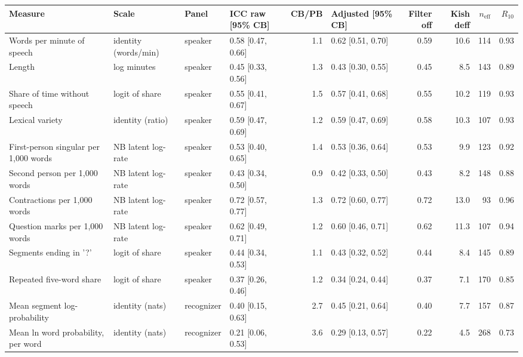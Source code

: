 {\scriptsize\setlength{\tabcolsep}{2.5pt}
\begin{tabular}{@{}p{}p{}llrlrrrr@{}}
\toprule
Measure & Scale & Panel & ICC raw [95\% CB] & CB/PB & Adjusted [95\% CB] & Filter off & Kish deff & $n_{\mathrm{eff}}$ & $R_{10}$ \\
\midrule
Words per minute of speech & identity (words/min) & speaker & 0.58 [0.47, 0.66] & 1.1 & 0.62 [0.51, 0.70] & 0.59 & 10.6 & 114 & 0.93 \\
Length & log minutes & speaker & 0.45 [0.33, 0.56] & 1.3 & 0.43 [0.30, 0.55] & 0.45 & 8.5 & 143 & 0.89 \\
Share of time without speech & logit of share & speaker & 0.55 [0.41, 0.67] & 1.5 & 0.57 [0.41, 0.68] & 0.55 & 10.2 & 119 & 0.93 \\
Lexical variety & identity (ratio) & speaker & 0.59 [0.47, 0.69] & 1.2 & 0.59 [0.47, 0.69] & 0.58 & 10.3 & 107 & 0.93 \\
First-person singular per 1,000 words & NB latent log-rate & speaker & 0.53 [0.40, 0.65] & 1.4 & 0.53 [0.36, 0.64] & 0.53 & 9.9 & 123 & 0.92 \\
Second person per 1,000 words & NB latent log-rate & speaker & 0.43 [0.34, 0.50] & 0.9 & 0.42 [0.33, 0.50] & 0.43 & 8.2 & 148 & 0.88 \\
Contractions per 1,000 words & NB latent log-rate & speaker & 0.72 [0.57, 0.77] & 1.3 & 0.72 [0.60, 0.77] & 0.72 & 13.0 & 93 & 0.96 \\
Question marks per 1,000 words & NB latent log-rate & speaker & 0.62 [0.49, 0.71] & 1.2 & 0.60 [0.46, 0.71] & 0.62 & 11.3 & 107 & 0.94 \\
Segments ending in '?' & logit of share & speaker & 0.44 [0.34, 0.53] & 1.1 & 0.43 [0.32, 0.52] & 0.44 & 8.4 & 145 & 0.89 \\
Repeated five-word share & logit of share & speaker & 0.37 [0.26, 0.46] & 1.2 & 0.34 [0.24, 0.44] & 0.37 & 7.1 & 170 & 0.85 \\
Mean segment log-probability & identity (nats) & recognizer & 0.40 [0.15, 0.63] & 2.7 & 0.45 [0.21, 0.64] & 0.40 & 7.7 & 157 & 0.87 \\
Mean ln word probability, per word & identity (nats) & recognizer & 0.21 [0.06, 0.53] & 3.6 & 0.29 [0.13, 0.57] & 0.22 & 4.5 & 268 & 0.73 \\

\end{tabular}}
